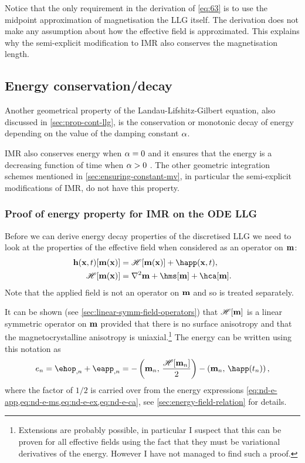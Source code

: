 Notice that the only requirement in the derivation of \cref{eq:63} is to use the midpoint approximation of magnetisation the LLG itself.
The derivation does not make any assumption about how the effective field is approximated.
This explains why the semi-explicit modification to IMR also conserves the magnetisation length. 


\subsection{Energy conservation/decay}
\label{sec:energy-cons}

Another geometrical property of the Landau-Lifshitz-Gilbert equation, also discussed in \cref{sec:prop-cont-llg}, is the conservation or monotonic decay of energy depending on the value of the damping constant $\alpha$.

IMR also conserves energy when $\alpha = 0$ and it ensures that the energy is a decreasing function of time when $\alpha > 0$ \cite{DAquino2005}.
The other geometric integration schemes mentioned in \cref{sec:ensuring-constant-mv}, in particular the semi-explicit modifications of IMR, do not have this property.


\subsubsection{Proof of energy property for IMR on the ODE LLG}
\label{sec:proof-energy-prop}

\newcommand{\happerror}{\mathcal{E}_\text{ap}}

Before we can derive energy decay properties of the discretised LLG we need to look at the properties of the effective field when considered as an operator on $\mathbf{m}$:
\begin{equation}
  \begin{aligned}
    \label{eq:hop}
    \hv(\xv, t)[\mv(\xv)] &= \hop [\mv(\xv)] + \happ(\xv, t), \\
    \hop [\mv(\xv)] &= \lap \mv + \hms[\mv] + \hca[\mv]. \\
  \end{aligned}
\end{equation}
Note that the applied field is not an operator on $\mathbf{m}$ and so is treated separately.

It can be shown (see \cref{sec:linear-symm-field-operators}) that $\mathscr{H}[\mathbf{m}]$ is a linear symmetric operator on $\mathbf{m}$ provided that there is no surface anisotropy and that the magnetocrystalline anisotropy is uniaxial.\footnote{Extensions are probably possible, in particular I suspect that this can be proven for all effective fields using the fact that they must be variational derivatives of the energy.
However I have not managed to find such a proof.}
The energy can be written using this notation as
\begin{equation}
  \label{eq:energy-hop}
  \e_n = \ehop_{,n} + \eapp_{,n} = - \ip{\mv_n}{\frac{\hop[\mv_n]}{2}} - \ip{\mv_n}{\happ(t_n)},
\end{equation}
where the factor of $1/2$ is carried over from the energy expressions \cref{eq:nd-e-app,eq:nd-e-ms,eq:nd-e-ex,eq:nd-e-ca}, see \cref{sec:energy-field-relation} for details.

